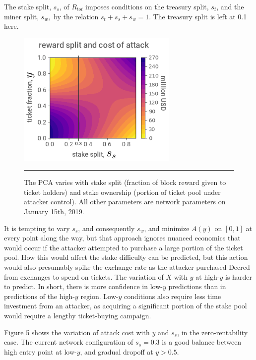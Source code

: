 \documentclass[a4paper,12pt]{article}
\begin{document}
The stake split, $ s_s $, of $ R_{tot} $ imposes conditions on the treasury split, $ s_t $, and the miner split, $ s_w, $ by the relation $ s_t + s_s + s_w = 1 $. The treasury split is left at 0.1 here. 
%
\begin{figure}[t!]
	\begin{center}
	\includegraphics[width=3.05in]{stakesplit}
\begin{minipage}[t]{0.85\textwidth}
	\caption{The PCA varies with stake split (fraction of block reward given to ticket holders) and stake ownership (portion of ticket pool under attacker control). All other parameters are network parameters on January 15th, 2019.}
	\end{minipage}
  	\end{center}
\vspace{5pt}
\hrule
\end{figure}
%
It is tempting to vary $ s_s $, and consequently $ s_w $, and minimize $ A(y) $ on $ [ 0, 1 ] $ at every point along the way, but that approach ignores nuanced economics that would occur if the attacker attempted to purchase a large portion of the ticket pool. How this would affect the stake difficulty can be predicted, but this action would also presumably spike the exchange rate as the attacker purchased Decred from exchanges to spend on tickets. The variation of $ X $ with $ y $ at high-$y$ is harder to predict. In short, there is more confidence in low-$ y $ predictions than in predictions of the high-$ y $ region. Low-$ y $ conditions also require less time investment from an attacker, as acquiring a significant portion of the stake pool would require a lengthy ticket-buying campaign. 

Figure 5 shows the variation of attack cost with $ y $ and $ s_s $, in the zero-rentability case. The current network configuration of $ s_s = 0.3 $ is a good balance between high entry point at low-$y$, and gradual dropoff at $y > 0.5$. 
\end{document}

